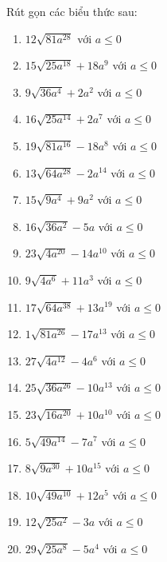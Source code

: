 \documentclass[12pt,a4paper]{article}
\begin{document}
\begin{ex}
	Rút gọn các biểu thức sau:
	\begin{enumerate}
		\item $12\sqrt{81a^{28}}$ với $a\leq  0$
		\item $15\sqrt{25a^{18}}+18a^{9}$ với $a\leq  0$
		\item $9\sqrt{36a^{4}}+2a^{2}$ với $a\leq  0$
		\item $16\sqrt{25a^{14}}+2a^{7}$ với $a\leq  0$
		\item $19\sqrt{81a^{16}}-18a^{8}$ với $a\leq  0$
		\item $13\sqrt{64a^{28}}-2a^{14}$ với $a\leq  0$
		\item $15\sqrt{9a^{4}}+9a^{2}$ với $a\leq  0$
		\item $16\sqrt{36a^{2}}-5a$ với $a\leq  0$
		\item $23\sqrt{4a^{20}}-14a^{10}$ với $a\leq  0$
		\item $9\sqrt{4a^{6}}+11a^{3}$ với $a\leq  0$
		\item $17\sqrt{64a^{38}}+13a^{19}$ với $a\leq  0$
		\item $1\sqrt{81a^{26}}-17a^{13}$ với $a\leq  0$
		\item $27\sqrt{4a^{12}}-4a^{6}$ với $a\leq  0$
		\item $25\sqrt{36a^{26}}-10a^{13}$ với $a\leq  0$
		\item $23\sqrt{16a^{20}}+10a^{10}$ với $a\leq  0$
		\item $5\sqrt{49a^{14}}-7a^{7}$ với $a\leq  0$
		\item $8\sqrt{9a^{30}}+10a^{15}$ với $a\leq  0$
		\item $10\sqrt{49a^{10}}+12a^{5}$ với $a\leq  0$
		\item $12\sqrt{25a^{2}}-3a$ với $a\leq  0$
		\item $29\sqrt{25a^{8}}-5a^{4}$ với $a\leq  0$
	\end{enumerate}
\end{ex}
\end{document}
